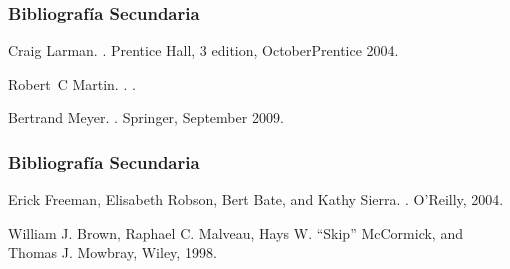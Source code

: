 \documentclass[a4paper,slidestop,xcolor=pst,blue]{beamer}
\begin{document}
\begin{frame}[c]
	\frametitle{Bibliografía Secundaria}
    \begin{thebibliography}{1}


Craig Larman.
.
\newblock Prentice Hall, 3 edition, OctoberPrentice 2004.

Robert~C Martin.
.
.

Bertrand Meyer.
.
\newblock Springer, September 2009.


\end{thebibliography}
\end{frame}

\begin{frame}[c]
	\frametitle{Bibliografía Secundaria}
    \begin{thebibliography}{1}



Erick Freeman, Elisabeth Robson, Bert Bate, and Kathy Sierra.
.
\newblock O'Reilly, 2004.

William J. Brown, Raphael C. Malveau, Hays W. ``Skip'' McCormick, and Thomas J. Mowbray,
\newblock Wiley, 1998.


\end{thebibliography}
\end{frame}
\end{document}
